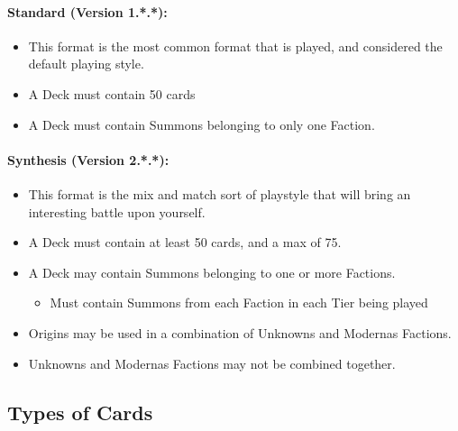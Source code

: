 \documentclass[12pt, letterpaper]{article}
\begin{document}
\paragraph{Standard (Version 1.*.*): \\}
\begin{itemize}
    \item This format is the most common format that is played, and considered the default playing style. 
    \item A Deck must contain 50 cards 
    \item A Deck must contain Summons belonging to only one Faction. 
\end{itemize}
\paragraph{Synthesis (Version 2.*.*): \\}
\begin{itemize}
    \item This format is the mix and match sort of playstyle that will bring an interesting battle upon yourself. 
    \item A Deck must contain at least 50 cards, and a max of 75. 
    \item A Deck may contain Summons belonging to one or more Factions. 
        \begin{itemize}
            \item Must contain Summons from each Faction in each Tier being played
        \end{itemize}
    \item Origins may be used in a combination of Unknowns and Modernas Factions. 
    \item Unknowns and Modernas Factions may not be combined together. 
\end{itemize}
\newpage
\subsection{Types of Cards}
\end{document}
